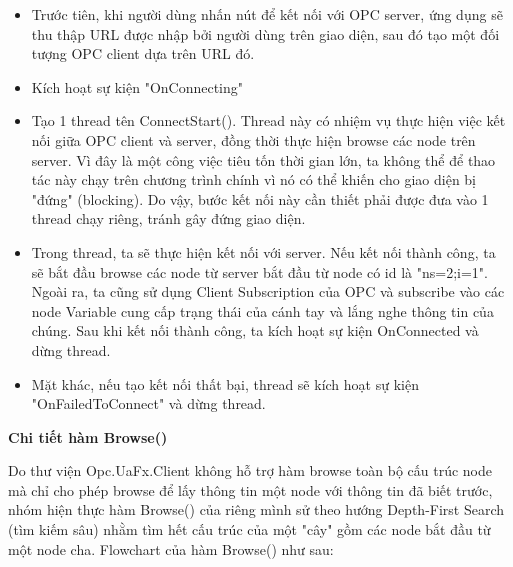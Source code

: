 \begin{itemize}
    \item Trước tiên, khi người dùng nhấn nút để kết nối với OPC server, ứng dụng sẽ thu thập URL được nhập bởi người dùng trên giao diện, sau đó tạo một đối tượng OPC client dựa trên URL đó. 
    \item Kích hoạt sự kiện "OnConnecting"
    \item Tạo 1 thread tên ConnectStart(). Thread này có nhiệm vụ thực hiện việc kết nối giữa OPC client và server, đồng thời thực hiện browse các node trên server. Vì đây là một công việc tiêu tốn thời gian lớn, ta không thể để thao tác này chạy trên chương trình chính vì nó có thể khiến cho giao diện bị "đứng" (blocking). Do vậy, bước kết nối này cần thiết phải được đưa vào 1 thread chạy riêng, tránh gây đứng giao diện.
    \item Trong thread, ta sẽ thực hiện kết nối với server. Nếu kết nối thành công, ta sẽ bắt đầu browse các node từ server bắt đầu từ node có id là "ns=2;i=1". Ngoài ra, ta cũng sử dụng Client Subscription của OPC và subscribe vào các node Variable cung cấp trạng thái của cánh tay và lắng nghe thông tin của chúng. Sau khi kết nối thành công, ta kích hoạt sự kiện OnConnected và dừng thread.
    \item Mặt khác, nếu tạo kết nối thất bại, thread sẽ kích hoạt sự kiện "OnFailedToConnect" và dừng thread.
\end{itemize}

\textbf{Chi tiết hàm Browse()}

Do thư viện Opc.UaFx.Client không hỗ trợ hàm browse toàn bộ cấu trúc node mà chỉ cho phép browse để lấy thông tin một node với thông tin đã biết trước, nhóm hiện thực hàm Browse() của riêng mình sử theo hướng Depth-First Search (tìm kiếm sâu) nhằm tìm hết cấu trúc của một "cây" gồm các node bắt đầu từ một node cha. Flowchart của hàm Browse() như sau:

